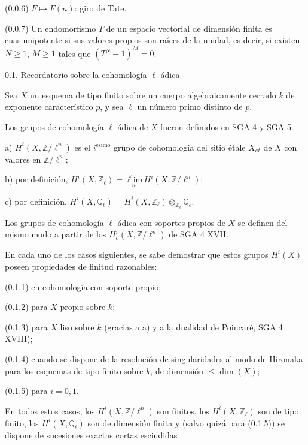(0.0.6)    $F \longmapsto F(n)$: giro de Tate.

(0.0.7)    Un endomorfismo $T$ de un espacio vectorial de dimensión finita es \underline{cuasiunipotente} si sus valores propios son raíces de la unidad, es decir, si existen $N \geqslant 1$, $M \geqslant 1$ tales que $(T^N - 1)^M = 0$.


0.1.  \underline{Recordatorio sobre la cohomología $\ell$-ádica}

Sea $X$ un esquema de tipo finito sobre un cuerpo algebraicamente cerrado $k$ de exponente característico $p$, y sea $\ell$ un número primo distinto de $p$.

Los grupos de cohomología $\ell$-ádica de $X$ fueron definidos en SGA 4 y SGA 5.

a) $H^i(X,\mathbb{Z}/\ell^n)$ es el $i^{\text{ésimo}}$ grupo de cohomología del sitio étale $X_{et}$ de $X$ con valores en $\mathbb{Z}/\ell^n$;

b) por definición, $H^i(X,\mathbb{Z}_\ell) = \underset{n}{\underleftarrow{\ell\mathrm{im}}}\, H^i(X,\mathbb{Z}/\ell^n)$;

c) por definición, $H^i(X,\mathbb{Q}_\ell) = H^i(X,\mathbb{Z}_\ell) \otimes_{\mathbb{Z}_\ell} \mathbb{Q}_\ell$.

Los grupos de cohomología $\ell$-ádica con soportes propios de $X$ se definen del mismo modo a partir de los $H^i_c(X,\mathbb{Z}/\ell^n)$ de SGA 4 XVII.

En cada uno de los casos siguientes, se sabe demostrar que estos grupos $H^i(X)$ poseen propiedades de finitud razonables:

(0.1.1)    en cohomología con soporte propio;

(0.1.2)    para $X$ propio sobre $k$;

(0.1.3)    para $X$ liso sobre $k$ (gracias a a) y a la dualidad de Poincaré, SGA 4 XVIII);

(0.1.4)    cuando se dispone de la resolución de singularidades al modo de Hironaka para los esquemas de tipo finito sobre $k$, de dimensión $\leqslant \dim(X)$;

(0.1.5)    para $i = 0, 1$.



En todos estos casos, los $H^i(X,\mathbb{Z}/\ell^n)$ son finitos, los $H^i(X,\mathbb{Z}_\ell)$ son de tipo finito, los $H^i(X,\mathbb{Q}_\ell)$ son de dimensión finita y (salvo quizá para (0.1.5)) se dispone de sucesiones exactas cortas escindidas


